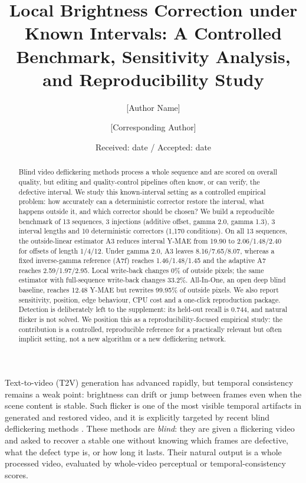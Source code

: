 \documentclass[twocolumn,10pt]{svjour3}
\title{Local Brightness Correction under Known Intervals: A Controlled Benchmark, Sensitivity Analysis, and Reproducibility Study}
\author{[Author Name] \and [Corresponding Author]}
\institute{[Department, University, City, Country]\\
           \email{corresponding@example.edu}}
\date{Received: date / Accepted: date}
\begin{document}
\maketitle
\begin{abstract}
Blind video deflickering methods process a whole sequence and are scored on overall quality, but editing and quality-control pipelines often know, or can verify, the defective interval. We study this known-interval setting as a controlled empirical problem: how accurately can a deterministic corrector restore the interval, what happens outside it, and which corrector should be chosen? We build a reproducible benchmark of 13 sequences, 3 injections (additive offset, gamma 2.0, gamma 1.3), 3 interval lengths and 10 deterministic correctors (1,170 conditions). On all 13 sequences, the outside-linear estimator A3 reduces interval Y-MAE from 19.90 to 2.06/1.48/2.40 for offsets of length 1/4/12. Under gamma 2.0, A3 leaves 8.16/7.65/8.07, whereas a fixed inverse-gamma reference (A7f) reaches 1.46/1.48/1.45 and the adaptive A7 reaches 2.59/1.97/2.95. Local write-back changes 0\% of outside pixels; the same estimator with full-sequence write-back changes 33.2\%. All-In-One, an open deep blind baseline, reaches 12.48 Y-MAE but rewrites 99.95\% of outside pixels. We also report sensitivity, position, edge behaviour, CPU cost and a one-click reproduction package. Detection is deliberately left to the supplement: its held-out recall is 0.744, and natural flicker is not solved. We position this as a reproducibility-focused empirical study: the contribution is a controlled, reproducible reference for a practically relevant but often implicit setting, not a new algorithm or a new deflickering network.
\end{abstract}



Text-to-video (T2V) generation has advanced rapidly, but temporal consistency remains a weak point: brightness can drift or jump between frames even when the scene content is stable. Such flicker is one of the most visible temporal artifacts in generated and restored video, and it is explicitly targeted by recent blind deflickering methods \cite{qiu2024blazebvd,lei2023blind,duan2024diffsynth}. These methods are \emph{blind}: they are given a flickering video and asked to recover a stable one without knowing which frames are defective, what the defect type is, or how long it lasts. Their natural output is a whole processed video, evaluated by whole-video perceptual or temporal-consistency scores.
\end{document}
